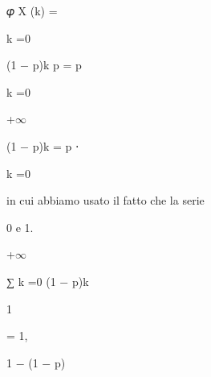 \documentclass[a4paper,portrait,12pt]{article}
\begin{document}
\begin{flushleft}
𝜑 X (k) =
\end{flushleft}


\begin{flushleft}
k =0
\end{flushleft}





\begin{flushleft}
(1 $-$ p)k p = p
\end{flushleft}





\begin{flushleft}
k =0
\end{flushleft}





+$\infty$





\begin{flushleft}
(1 $-$ p)k = p ⋅
\end{flushleft}





\begin{flushleft}
k =0
\end{flushleft}





\begin{flushleft}
in cui abbiamo usato il fatto che la serie
\end{flushleft}


\begin{flushleft}
0 e 1.
\end{flushleft}





+$\infty$


\begin{flushleft}
∑ k =0 (1 $-$ p)k
\end{flushleft}





1


= 1,


\begin{flushleft}
1 $-$ (1 $-$ p)
\end{flushleft}
\end{document}
